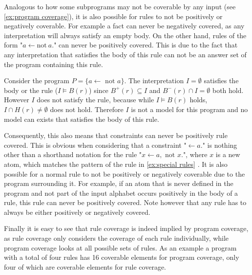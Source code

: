 Analogous to how some subprograms may not be coverable by any input (see \cref{ex:program coverage}), it is also possible for rules to not be positively or negatively coverable. For example a fact can never be negatively covered, as any interpretation will always satisfy an empty body. On the other hand, rules of the form "\(a \leftarrow \text{not}\ a.\)" can never be positively covered. This is due to the fact that any interpretation that satisfies the body of this rule can not be an answer set of the program containing this rule.

\begin{example}
\label{ex:special rules}
    Consider the program \(P = \{a \leftarrow \text{ not } a\}\).
    The interpretation \(I = \emptyset\) satisfies the body or the rule (\(I \models B(r)\)) since \(B^+(r) \subseteq I\) and \(B^-(r) \cap I = \emptyset\) both hold. However $I$ does not satisfy the rule, because while \(I \models B(r)\) holds, \(I \cap H(r) \neq \emptyset\) does not hold. Therefore $I$ is not a model for this program and no model can exists that satisfies the body of this rule.
\end{example}

Consequently, this also means that constraints can never be positively rule covered. This is obvious when considering that a constraint "\(\leftarrow a.\)" is nothing other than a shorthand notation for the rule "\(x \leftarrow a, \text{ not } x.\)", where $x$ is a new atom, which matches the pattern of the rule in \cref{ex:special rules} \cite[p. 17]{Geb+12}. It is also possible for a normal rule to not be positively or negatively coverable due to the program surrounding it. For example, if an atom that is never defined in the program and not part of the input alphabet occurs positively in the body of a rule, this rule can never be positively covered. Note however that any rule has to always be either positively or negatively covered.

Finally it is easy to see that rule coverage is indeed implied by program coverage, as rule coverage only considers the coverage of each rule individually, while program coverage looks at all possible sets of rules. As an example a program with a total of four rules has 16 coverable elements for program coverage, only four of which are coverable elements for rule coverage.

\begin{comment}
    - Definition + example      \/
    
    - (similar to program coverage in some ways but less complex!)
    
    - some rules may sometimes (or always) not be coverable -> examples -> ties back to beginning of the chapter / thats why coverage 
    is defined on coverable objects     \/
    
    (- total program coverage implies total rule coverage -> not so relevant but maybe interesting to mention?)      \/
\end{comment}


